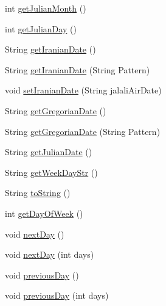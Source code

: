 \begin{DoxyCompactItemize}
\item 
int \hyperlink{classcom_1_1_seyed_ali_roshan_1_1www_1_1_calendar_tool_a55ec1b9e58157723f2ea6a5d4167a3f0}{get\+Julian\+Month} ()
\item 
int \hyperlink{classcom_1_1_seyed_ali_roshan_1_1www_1_1_calendar_tool_a41147d1ef316a32e2db40eed38022496}{get\+Julian\+Day} ()
\item 
String \hyperlink{classcom_1_1_seyed_ali_roshan_1_1www_1_1_calendar_tool_a77886e70247351f6f845fa88bdc8fa14}{get\+Iranian\+Date} ()
\item 
String \hyperlink{classcom_1_1_seyed_ali_roshan_1_1www_1_1_calendar_tool_af9a814c0d0be587f5598a479d35d6f7b}{get\+Iranian\+Date} (String Pattern)
\item 
void \hyperlink{classcom_1_1_seyed_ali_roshan_1_1www_1_1_calendar_tool_a9995342b318abf5e7ef064432501f06a}{set\+Iranian\+Date} (String jalali\+Air\+Date)
\item 
String \hyperlink{classcom_1_1_seyed_ali_roshan_1_1www_1_1_calendar_tool_a2d6513e1ec00cb12ee49728ec8879e20}{get\+Gregorian\+Date} ()
\item 
String \hyperlink{classcom_1_1_seyed_ali_roshan_1_1www_1_1_calendar_tool_a64e054f39d6cf063e0abcb23c107761c}{get\+Gregorian\+Date} (String Pattern)
\item 
String \hyperlink{classcom_1_1_seyed_ali_roshan_1_1www_1_1_calendar_tool_ae0c8c9034e150da4d8442f374244cab3}{get\+Julian\+Date} ()
\item 
String \hyperlink{classcom_1_1_seyed_ali_roshan_1_1www_1_1_calendar_tool_a04489ed109d9d4d88b12ef7cfe6d84c8}{get\+Week\+Day\+Str} ()
\item 
String \hyperlink{classcom_1_1_seyed_ali_roshan_1_1www_1_1_calendar_tool_ad236b0b986cfd9a5d4c62c1fd2b3e836}{to\+String} ()
\item 
int \hyperlink{classcom_1_1_seyed_ali_roshan_1_1www_1_1_calendar_tool_a47c154df912d7c29f787e9724d5b19bf}{get\+Day\+Of\+Week} ()
\item 
void \hyperlink{classcom_1_1_seyed_ali_roshan_1_1www_1_1_calendar_tool_ab59e8a3ee76803057ef8210f6d7a9bbd}{next\+Day} ()
\item 
void \hyperlink{classcom_1_1_seyed_ali_roshan_1_1www_1_1_calendar_tool_a52daf9e8935afad5dff3e1482c47bc30}{next\+Day} (int days)
\item 
void \hyperlink{classcom_1_1_seyed_ali_roshan_1_1www_1_1_calendar_tool_aba478ff987023dc1b76c9e58193a59f4}{previous\+Day} ()
\item 
void \hyperlink{classcom_1_1_seyed_ali_roshan_1_1www_1_1_calendar_tool_a00d787ebbcd21fb884e0e6708b88fe84}{previous\+Day} (int days)

\end{DoxyCompactItemize}

